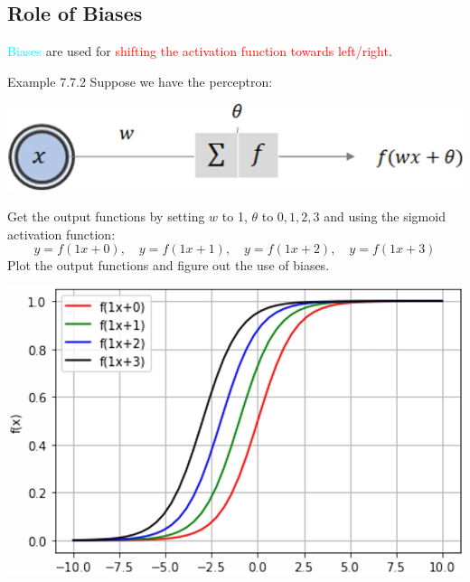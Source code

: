 \documentclass{book}
\begin{document}
\subsection{Role of Biases}
\textcolor{cyan}{Biases} are used for \textcolor{red}{shifting the activation function towards left/right}.\\
\begin{egBox}{Example 7.7.2}{}
Suppose we have the perceptron:
\begin{center}
    \includegraphics[scale=0.12]{chapter 7/ch7_figure29.jpeg}
\end{center}
Get the output functions by setting $w$ to 1, $\theta$ to \(0, 1, 2, 3\) and using the sigmoid activation function:
\[
    y = f(1x+0), \quad y = f(1x+1), \quad y = f(1x+2), \quad y = f(1x+3)
\]
Plot the output functions and figure out the use of biases.
\begin{center}
    \includegraphics[scale=0.18]{chapter 7/ch7_figure31.jpeg}
\end{center}
\end{egBox}
\end{document}
